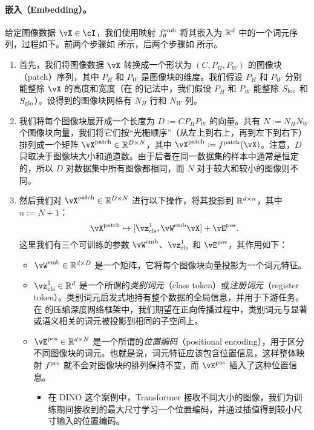 \documentclass[../../book-main.tex]{subfiles}
\begin{document}
\paragraph{嵌入（Embedding）。} 给定图像数据 \(\vX \in \cI\)，我们使用映射 \(f_{\theta}^{\mathrm{emb}}\) 将其嵌入为 \(\mathbb{R}^{d}\) 中的一个词元序列，过程如下。前两个步骤如  所示，后两个步骤如  所示。
\begin{enumerate}
    \item 首先，我们将图像数据 \(\vX\) 转换成一个形状为 \((C, P_{H}, P_{W})\) 的图像块（patch）序列，其中 \(P_{H}\) 和 \(P_{W}\) 是图像块的维度。我们假设 \(P_{H}\) 和 \(P_{W}\) 分别能整除 \(\vX\) 的高度和宽度（在  的记法中，我们假设 \(P_{H}\) 和 \(P_{W}\) 能整除 \(S_{\mathrm{loc}}\) 和 \(S_{\mathrm{glo}}\)）。设得到的图像块网格有 \(N_{H}\) 行和 \(N_{W}\) 列。
    \item 我们将每个图像块展开成一个长度为 \(D := CP_{H}P_{W}\) 的向量。共有 \(N := N_{H}N_{W}\) 个图像块向量，我们将它们按“光栅顺序”（从左上到右上，再到左下到右下）排列成一个矩阵 \(\vX^{\patch} \in \R^{D \times N}\)，其中 \(\vX^{\patch} := f^{\patch}(\vX)\)。注意，\(D\) 只取决于图像块大小和通道数。由于后者在同一数据集的样本中通常是恒定的，所以 \(D\) 对数据集中所有图像都相同，而 \(N\) 对于较大和较小的图像则不同。
    \item 然后我们对 \(\vX^{\patch} \in \R^{D \times N}\) 进行以下操作，将其投影到 \(\mathbb{R}^{d \times n}\)，其中 \(n := N + 1\)：
    \begin{equation}
        \vX^{\patch} \mapsto [\vz_{\cls}^{1}, \vW^{\emb}\vX] + \vE^{\pos}.
    \end{equation}
    这里我们有三个可训练的参数 \(\vW^{\emb}\)、\(\vz_{\cls}^{1}\) 和 \(\vE^{\pos}\)，其作用如下：
    \begin{itemize}
        \item \(\vW^{\emb} \in \R^{d \times D}\) 是一个矩阵，它将每个图像块向量投影为一个词元特征。
        \item \(\vz_{\cls}^{1} \in \R^{d}\) 是一个所谓的\textit{类别词元}（class token）或\textit{注册词元}（register token）。类别词元启发式地持有整个数据的全局信息，并用于下游任务。在  的压缩深度网络框架中，我们期望在正向传播过程中，类别词元与显著或语义相关的词元被投影到相同的子空间上。
        \item \(\vE^{\pos} \in \R^{d \times N}\) 是一个所谓的\textit{位置编码}（positional encoding），用于区分不同图像块的词元。也就是说，词元特征应该包含位置信息，这样整体映射 \(f^{\mathrm{pre}}\) 就不会对图像块的排列保持不变，而 \(\vE^{\pos}\) 插入了这种位置信息。
        \begin{itemize}
            \item 在 DINO 这个案例中，Transformer 接收不同大小的图像，我们为训练期间接收到的最大尺寸学习一个位置编码，并通过插值得到较小尺寸输入的位置编码。
        \end{itemize}
    \end{itemize}
\end{enumerate}
\end{document}
